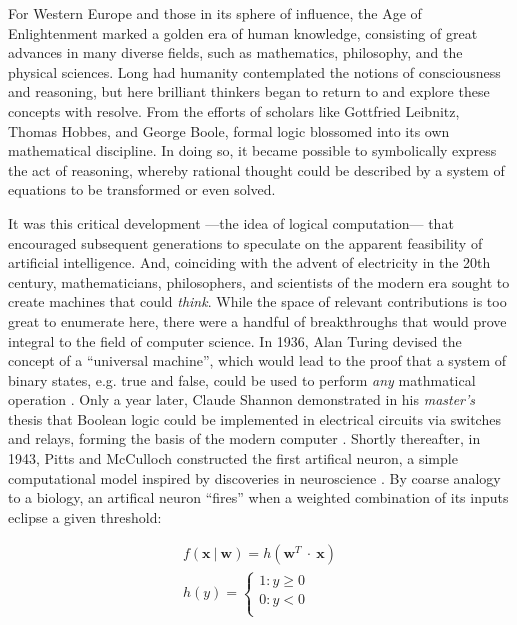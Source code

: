 For Western Europe and those in its sphere of influence, the Age of Enlightenment marked a golden era of human knowledge, consisting of great advances in many diverse fields, such as mathematics, philosophy, and the physical sciences.
Long had humanity contemplated the notions of consciousness and reasoning, but here brilliant thinkers began to return to and explore these concepts with resolve.
From the efforts of scholars like Gottfried Leibnitz, Thomas Hobbes, and George Boole, formal logic blossomed into its own mathematical discipline.
In doing so, it became possible to symbolically express the act of reasoning, whereby rational thought could be described by a system of equations to be transformed or even solved.

It was this critical development ---the idea of logical computation--- that encouraged subsequent generations to speculate on the apparent feasibility of artificial intelligence.
And, coinciding with the advent of electricity in the 20th century, mathematicians, philosophers, and scientists of the modern era sought to create machines that could \emph{think}.
While the space of relevant contributions is too great to enumerate here, there were a handful of breakthroughs that would prove integral to the field of computer science.
In 1936, Alan Turing devised the concept of a ``universal machine'', which would lead to the proof that a system of binary states, e.g. true and false, could be used to perform \emph{any} mathmatical operation \cite{Turing1936}.
Only a year later, Claude Shannon demonstrated in his \emph{master's} thesis that Boolean logic could be implemented in electrical circuits via switches and relays, forming the basis of the modern computer \cite{Shannon1937}.
Shortly thereafter, in 1943, Pitts and McCulloch constructed the first artifical neuron, a simple computational model inspired by discoveries in neuroscience \cite{Pitts1943}.
By coarse analogy to a biology, an artifical neuron ``fires'' when a weighted combination of its inputs eclipse a given threshold:

\begin{align*}
  f(\mathbf{x}~|~\mathbf{w}) = h(\mathbf{w}^T~\cdot~\mathbf{x})\\
  h(y) = \left\{
    \begin{array}{ll}
      1 : y \ge 0\\
      0 : y < 0\\
    \end{array}
  \right.
\label{eq:perceptron}
\end{align*}

